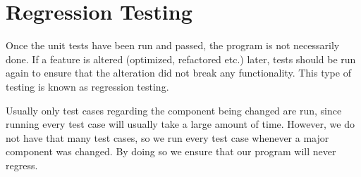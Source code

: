 \section{Regression Testing}
Once the unit tests have been run and passed, the program is not necessarily done.
If a feature is altered (optimized, refactored etc.) later, tests should be run again to ensure that the alteration did not break any functionality. \cite{waterfallroyce} This type of testing is known as regression testing.

Usually only test cases regarding the component being changed are run, since running every test case will usually take a large amount of time.
However, we do not have that many test cases, so we run every test case whenever a major component was changed.
By doing so we ensure that our program will never regress.
